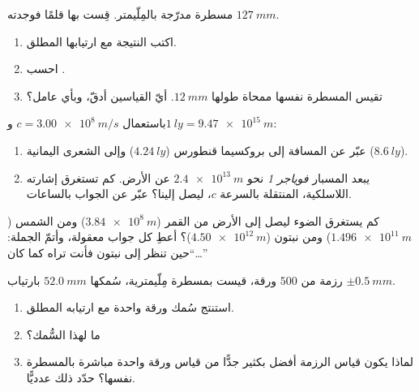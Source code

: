 \begin{exercise}[$\star$]\label{exo:g10:orders-of-magnitude:5}
مسطرة مدرّجة بالمِلّيمتر. قِست بها قلمًا فوجدته
$\qty{127}{mm}$.
\begin{enumerate}
  \item اكتب النتيجة مع ارتيابها المطلق.
  \item احسب .
  \item تقيس المسطرة نفسها ممحاة طولها $\qty{12}{mm}$. أيّ
        القياسين أدقّ، وبأي عامل؟
\end{enumerate}
\end{exercise}

\begin{exercise}[$\star\star$]\label{exo:g10:orders-of-magnitude:6}
باستعمال $c = \qty{3.00e8}{m/s}$ و$\qty{1}{ly} = \qty{9.47e15}{m}$:
\begin{enumerate}
  \item عبّر  عن المسافة إلى بروكسيما قنطورس
        ($\qty{4.24}{ly}$) وإلى الشعرى اليمانية ($\qty{8.6}{ly}$).
  \item يبعد المسبار \emph{فوياجر 1} نحو $\qty{2.4e13}{m}$ عن
        الأرض. كم تستغرق إشارته اللاسلكية، المنتقلة بالسرعة $c$،
        ليصل إلينا؟ عبّر عن الجواب بالساعات.
\end{enumerate}
\end{exercise}

\begin{exercise}[$\star\star$]\label{exo:g10:orders-of-magnitude:7}
كم يستغرق الضوء ليصل إلى الأرض من القمر
($\qty{3.84e8}{m}$) ومن الشمس ($\qty{1.496e11}{m}$) ومن
نبتون ($\qty{4.50e12}{m}$)؟ أعطِ كل جواب  معقولة،
وأتمّ الجملة: ``حين تنظر إلى نبتون فأنت تراه كما
كان\dots''
\end{exercise}

\begin{exercise}[$\star\star$]\label{exo:g10:orders-of-magnitude:8}
رزمة من $500$ ورقة، قيست بمسطرة مِلّيمترية، سُمكها
$\qty{52.0}{mm}$ بارتياب $\pm\qty{0.5}{mm}$.
\begin{enumerate}
  \item استنتج سُمك ورقة واحدة مع ارتيابه
        المطلق.
  \item ما  لهذا السُّمك؟
  \item لماذا يكون قياس الرزمة أفضل بكثير جدًّا من قياس
        ورقة واحدة مباشرة بالمسطرة نفسها؟ حدّد ذلك عدديًّا.
\end{enumerate}
\end{exercise}


